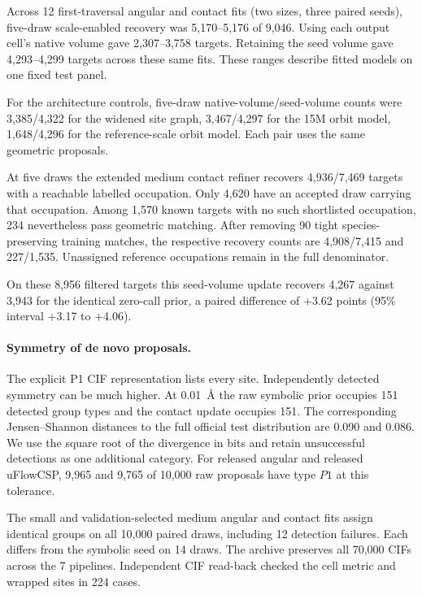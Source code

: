 Across 12 first-traversal angular and contact fits (two sizes, three paired seeds), five-draw scale-enabled recovery was 5,170--5,176 of 9,046. Using each output cell's native volume gave 2,307--3,758 targets. Retaining the seed volume gave 4,293--4,299 targets across these same fits. These ranges describe fitted models on one fixed test panel.

For the architecture controls, five-draw native-volume/seed-volume counts were 3,385/4,322 for the widened site graph, 3,467/4,297 for the 15M orbit model, 1,648/4,296 for the reference-scale orbit model. Each pair uses the same geometric proposals.

At five draws the extended medium contact refiner recovers 4,936/7,469 targets with a reachable labelled occupation. Only 4,620 have an accepted draw carrying that occupation. Among 1,570 known targets with no such shortlisted occupation, 234 nevertheless pass geometric matching. After removing 90 tight species-preserving training matches, the respective recovery counts are 4,908/7,415 and 227/1,535. Unassigned reference occupations remain in the full denominator.

On these 8,956 filtered targets this seed-volume update recovers 4,267 against 3,943 for the identical zero-call prior, a paired difference of +3.62 points (95\% interval +3.17 to +4.06).

\paragraph{Symmetry of de novo proposals.}

The explicit P1 CIF representation lists every site. Independently detected symmetry can be much higher. At 0.01~\AA{} the raw symbolic prior occupies 151 detected group types and the contact update occupies 151. The corresponding Jensen--Shannon distances to the full official test distribution are 0.090 and 0.086. We use the square root of the divergence in bits and retain unsuccessful detections as one additional category. For released angular and released uFlowCSP, 9,965 and 9,765 of 10,000 raw proposals have type $P1$ at this tolerance.

The small and validation-selected medium angular and contact fits assign identical groups on all 10,000 paired draws, including 12 detection failures. Each differs from the symbolic seed on 14 draws. The archive preserves all 70,000 CIFs across the 7 pipelines. Independent CIF read-back checked the cell metric and wrapped sites in 224 cases.

